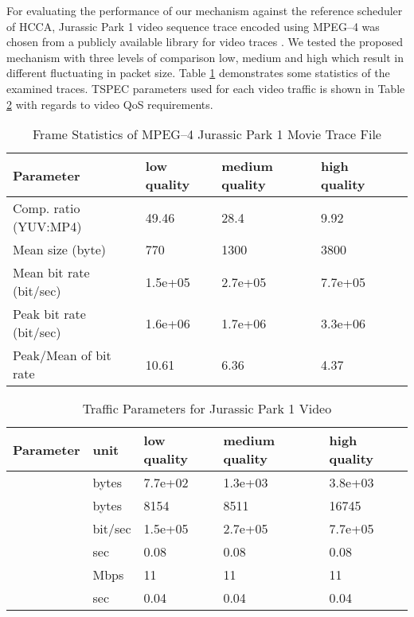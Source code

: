 \documentclass[a4paper, conference]{IEEEtran}
\begin{document}
For evaluating the performance of our mechanism against the reference scheduler of HCCA, Jurassic Park 1 video sequence trace encoded using MPEG--4 was chosen from a publicly available library for video traces \cite{Fitzek2001}. We tested the proposed mechanism with three levels of comparison low, medium and high which result in different fluctuating in packet size. Table \ref{tab:traceStats} demonstrates some statistics of the examined traces. TSPEC parameters used for each video traffic is shown in Table \ref{tab:VideoParas} with regards to video QoS requirements.
\begin{table}
\centering
\caption {Frame Statistics of MPEG--4 Jurassic Park 1 Movie Trace File}
    \begin{tabular}{lllll}
\hline
Parameter				& low quality	& medium quality& high quality	\\
\hline
Comp. ratio (YUV:MP4)	& 49.46			& 28.4			& 9.92			\\
Mean size (byte)		& 770			& 1300			& 3800			\\
Mean bit rate (bit/sec)	& 1.5e+05		& 2.7e+05		& 7.7e+05		\\
Peak bit rate (bit/sec)	& 1.6e+06		& 1.7e+06		& 3.3e+06		\\
Peak/Mean of bit rate	& 10.61			& 6.36			& 4.37			\\ \hline 
\end{tabular}
\label{tab:traceStats}
\end{table}
\begin{table}
\centering
\caption {Traffic Parameters for Jurassic Park 1 Video}
\begin{tabular}[width=\linewidth]{lllll}
    \hline
    Parameter	& unit		& low quality	& medium quality	& high quality	\\ \hline
    			& bytes		& 7.7e+02		& 1.3e+03			& 3.8e+03 		\\
    			& bytes		& 8154			& 8511				& 16745 		\\
    		& bit/sec	& 1.5e+05		& 2.7e+05			& 7.7e+05		\\
    			& sec		& 0.08			& 0.08				& 0.08			\\
    			& Mbps		& 11			& 11				& 11			\\
    		& sec		& 0.04			& 0.04				& 0.04			\\ \hline
    \end{tabular}
\label{tab:VideoParas}
\end{table}
\end{document}

